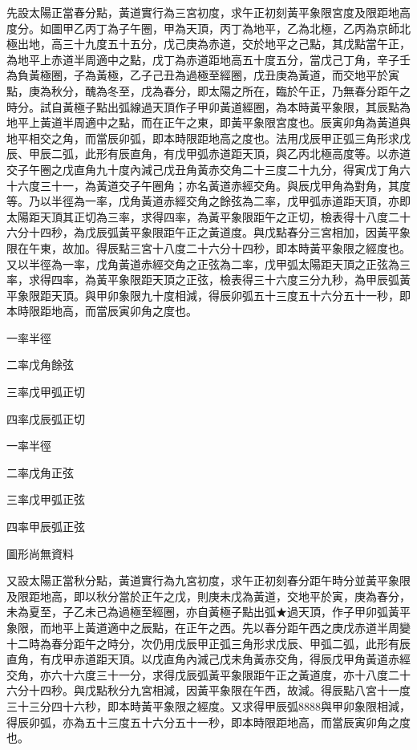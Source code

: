 \begin{pinyinscope}
先設太陽正當春分點，黃道實行為三宮初度，求午正初刻黃平象限宮度及限距地高度分。如圖甲乙丙丁為子午圈，甲為天頂，丙丁為地平，乙為北極，乙丙為京師北極出地，高三十九度五十五分，戊己庚為赤道，交於地平之己點，其戊點當午正，為地平上赤道半周適中之點，戊丁為赤道距地高五十度五分，當戊己丁角，辛子壬為負黃極圈，子為黃極，乙子己丑為過極至經圈，戊丑庚為黃道，而交地平於寅點，庚為秋分，醜為冬至，戊為春分，即太陽之所在，臨於午正，乃無春分距午之時分。試自黃極子點出弧線過天頂作子甲卯黃道經圈，為本時黃平象限，其辰點為地平上黃道半周適中之點，而在正午之東，即黃平象限宮度也。辰寅卯角為黃道與地平相交之角，而當辰卯弧，即本時限距地高之度也。法用戊辰甲正弧三角形求戊辰、甲辰二弧，此形有辰直角，有戊甲弧赤道距天頂，與乙丙北極高度等。以赤道交子午圈之戊直角九十度內減己戊丑角黃赤交角二十三度二十九分，得寅戊丁角六十六度三十一，為黃道交子午圈角；亦名黃道赤經交角。與辰戊甲角為對角，其度等。乃以半徑為一率，戊角黃道赤經交角之餘弦為二率，戊甲弧赤道距天頂，亦即太陽距天頂其正切為三率，求得四率，為黃平象限距午之正切，檢表得十八度二十六分十四秒，為戊辰弧黃平象限距午正之黃道度。與戊點春分三宮相加，因黃平象限在午東，故加。得辰點三宮十八度二十六分十四秒，即本時黃平象限之經度也。又以半徑為一率，戊角黃道赤經交角之正弦為二率，戊甲弧太陽距天頂之正弦為三率，求得四率，為黃平象限距天頂之正弦，檢表得三十六度三分九秒，為甲辰弧黃平象限距天頂。與甲卯象限九十度相減，得辰卯弧五十三度五十六分五十一秒，即本時限距地高，而當辰寅卯角之度也。

一率半徑

二率戊角餘弦

三率戊甲弧正切

四率戊辰弧正切

一率半徑

二率戊角正弦

三率戊甲弧正弦

四率甲辰弧正弦

圖形尚無資料

又設太陽正當秋分點，黃道實行為九宮初度，求午正初刻春分距午時分並黃平象限及限距地高，即以秋分當於正午之戊，則庚未戊為黃道，交地平於寅，庚為春分，未為夏至，子乙未己為過極至經圈，亦自黃極子點出弧★過天頂，作子甲卯弧黃平象限，而地平上黃道適中之辰點，在正午之西。先以春分距午西之庚戊赤道半周變十二時為春分距午之時分，次仍用戊辰甲正弧三角形求戊辰、甲弧二弧，此形有辰直角，有戊甲赤道距天頂。以戊直角內減己戊未角黃赤交角，得辰戊甲角黃道赤經交角，亦六十六度三十一分，求得戊辰弧黃平象限距午正之黃道度，亦十八度二十六分十四秒。與戊點秋分九宮相減，因黃平象限在午西，故減。得辰點八宮十一度三十三分四十六秒，即本時黃平象限之經度。又求得甲辰弧8888與甲卯象限相減，得辰卯弧，亦為五十三度五十六分五十一秒，即本時限距地高，而當辰寅卯角之度也。


\end{pinyinscope}
